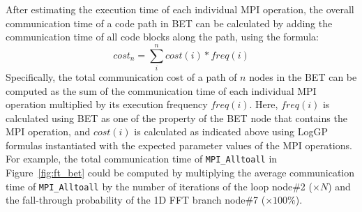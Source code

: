 After estimating the execution time of each individual MPI operation,
  the overall communication time of a code path in BET can be calculated by adding the communication time of all code blocks along the path, using the formula:
\begin{equation}
  cost_{n} = \sum\limits_{i}^{n} cost(i) * freq(i)
\end{equation}
Specifically, the total communication cost of a path of $n$ nodes in the BET can be computed as the sum of
  the communication time of each individual MPI operation multiplied by its execution frequency $freq(i)$.
Here, $freq(i)$ is calculated using BET as one of the property of the BET node that contains the MPI operation,
and $cost(i)$ is calculated as indicated above using LogGP formulas instantiated with the expected parameter values of the MPI operations.
For example, the total communication time of \texttt{MPI\_Alltoall} in Figure~\ref{fig:ft_bet} could be computed by
  multiplying the average communication time of \texttt{MPI\_Alltoall} by the number of iterations of the loop node\#2 ($\times N$)
  and the fall-through probability of the 1D FFT branch node\#7 ($\times 100\%$).


